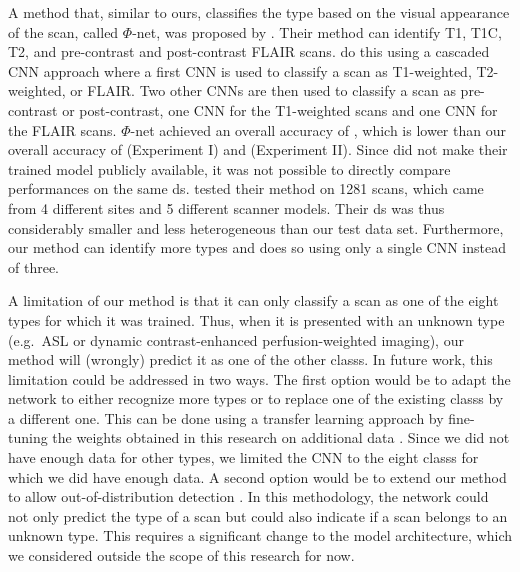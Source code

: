 A method that, similar to ours, classifies the \gls{type} based on the visual appearance of the \gls{scan}, called $\Phi$-net, was proposed by .
Their method can identify \gls{T1}, \gls{T1C}, \gls{T2}, and pre-contrast and post-contrast FLAIR \glspl{scan}.
 do this using a cascaded \gls{CNN} approach where a first \gls{CNN} is used to classify a \gls{scan} as T1-weighted, T2-weighted, or FLAIR\@.
Two other \glspl{CNN} are then used to classify a \gls{scan} as pre-contrast or post-contrast, one \gls{CNN} for the T1-weighted \glspl{scan} and one \gls{CNN} for the FLAIR \glspl{scan}.
$\Phi$-net achieved an overall accuracy of , which is lower than our overall accuracy of  (Experiment I) and  (Experiment II).
Since  did not make their trained model publicly available, it was not possible to directly compare performances on the same \gls{ds}.
 tested their method on 1281 \glspl{scan}, which came from 4 different \glspl{site} and 5 different scanner models.
Their \gls{ds} was thus considerably smaller and less heterogeneous than our test data set.
Furthermore, our method can identify more \glspl{type} and does so using only a single \gls{CNN} instead of three.

A limitation of our method is that it can only classify a \gls{scan} as one of the eight \glspl{type} for which it was trained.
Thus, when it is presented with an unknown \gls{type} (e.g.\ \gls{ASL} or dynamic contrast-enhanced perfusion-weighted imaging), our method will (wrongly) predict it as one of the other \glspl{class}.
In future work, this limitation could be addressed in two ways.
The first option would be to adapt the network to either recognize more \glspl{type} or to replace one of the existing \glspl{class} by a different one.
This can be done using a transfer learning approach by fine-tuning the weights obtained in this research on additional data \autocite{tajbakhsh2016convolutional}.
Since we did not have enough data for other \glspl{type}, we limited the \gls{CNN} to the eight \glspl{class} for which we did have enough data.
A second option would be to extend our method to allow out-of-distribution detection \autocite{devries2018learning}.
In this methodology, the network could not only predict the \gls{type} of a \gls{scan} but could also indicate if a \gls{scan} belongs to an unknown \gls{type}.
This requires a significant change to the model architecture, which we considered outside the scope of this research for now.

